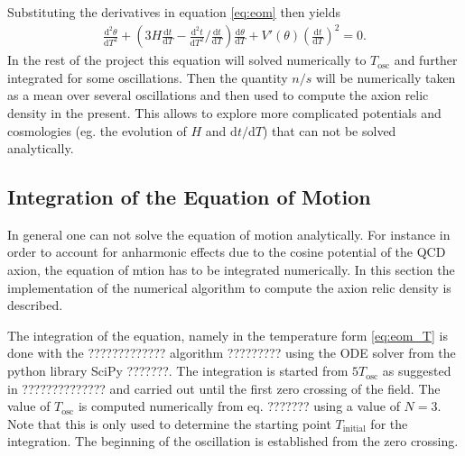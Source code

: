 \documentclass[a4paper, 12pt]{article}
\newcommand{\diff}{\mathrm{d}}
\begin{document}
Substituting the derivatives in equation \ref{eq:eom} then yields  \cite[Section S11]{LatticQCD4Cosmo}
\begin{align}
    \label{eq:eom_T}
    \frac{\diff^2 \theta}{\diff T^2} +
                 \left(
                 3H \frac{\diff t}{\diff T}
                 - \frac{\diff^2 t}{\diff T^2} / \frac{\diff t}{\diff T}
                 \right) \frac{\diff \theta}{\diff T} +
                 V'(\theta) \left( \frac{\diff t}{\diff T} \right)^2 = 0.
\end{align}
In the rest of the project this equation will solved numerically to $T_\mathrm{osc}$ and
further integrated for some oscillations.
Then the quantity $n/s$ will be numerically taken as a mean over several oscillations
and then used to compute the axion relic density in the present. This allows to explore more
complicated potentials and cosmologies (eg. the evolution of $H$ and $\diff t / \diff T$) that can not be solved analytically.




\subsection{Integration of the Equation of Motion}
In general one can not solve the equation of motion analytically.
For instance in order to account for anharmonic effects due to
the cosine potential of the QCD axion, the equation of mtion
has to be integrated numerically. In this section
the implementation of the numerical algorithm to
compute the axion relic density is described.

\noindent
The integration of the equation, namely in the temperature
form \ref{eq:eom_T} is done with
the ????????????? algorithm ????????? using the
ODE solver from the python library SciPy ???????.
The integration is started from $5 T_\mathrm{osc}$ as suggested
in ?????????????? and carried out until the first zero
crossing of the field.
The value of $T_\mathrm{osc}$ is computed numerically from eq. ??????? using a value of $N = 3$.
Note that this is only used to determine the starting point $T_\mathrm{initial}$ for the integration.
The beginning of the oscillation is established from the zero crossing.
\end{document}
